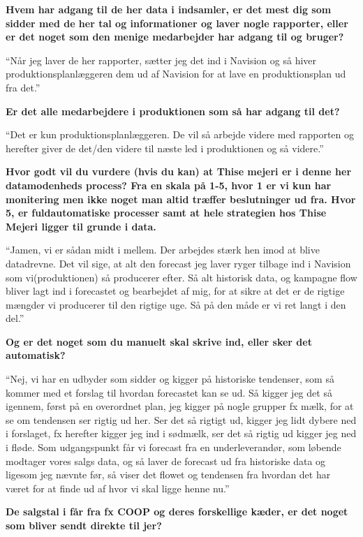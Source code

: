 \documentclass[
  12pt,
  a4paper,
  DIV=11,
  numbers=noendperiod]{scrartcl}
\begin{document}
\begin{itemize}
  \textbf{Hvem har adgang til de her data i indsamler, er det mest dig
  som sidder med de her tal og informationer og laver nogle rapporter,
  eller er det noget som den menige medarbejder har adgang til og
  bruger?}~

  ``Når jeg laver de her rapporter, sætter jeg det ind i Navision og så
  hiver produktionsplanlæggeren dem ud af Navision for at lave en
  produktionsplan ud fra det.''~

  \textbf{Er det alle medarbejdere i produktionen som så har adgang til
  det?}~

  ``Det er kun produktionsplanlæggeren. De vil så arbejde videre med
  rapporten og herefter giver de det/den videre til næste led i
  produktionen og så videre.''~

  \textbf{Hvor godt vil du vurdere (hvis du kan) at Thise mejeri er i
  denne her datamodenheds process? Fra en skala på 1-5, hvor 1 er vi kun
  har monitering men ikke noget man altid træffer beslutninger ud fra.
  Hvor 5, er fuldautomatiske processer samt at hele strategien hos Thise
  Mejeri ligger til grunde i data.}~

  ``Jamen, vi er sådan midt i mellem. Der arbejdes stærk hen imod at
  blive datadrevne. Det vil sige, at alt den forecast jeg laver ryger
  tilbage ind i Navision som vi(produktionen) så producerer efter. Så
  alt historisk data, og kampagne flow bliver lagt ind i forecastet og
  bearbejdet af mig, for at sikre at det er de rigtige mængder vi
  producerer til den rigtige uge. Så på den måde er vi ret langt i den
  del.''~

  \textbf{Og er det noget som du manuelt skal skrive ind, eller sker det
  automatisk?}~

  ``Nej, vi har en udbyder som sidder og kigger på historiske tendenser,
  som så kommer med et forslag til hvordan forecastet kan se ud. Så
  kigger jeg det så igennem, først på en overordnet plan, jeg kigger på
  nogle grupper fx mælk, for at se om tendensen ser rigtig ud her. Ser
  det så rigtigt ud, kigger jeg lidt dybere ned i forslaget, fx herefter
  kigger jeg ind i sødmælk, ser det så rigtig ud kigger jeg ned i fløde.
  Som udgangspunkt får vi forecast fra en underleverandør, som løbende
  modtager vores salgs data, og så laver de forecast ud fra historiske
  data og ligesom jeg nævnte før, så viser det flowet og tendensen fra
  hvordan det har været for at finde ud af hvor vi skal ligge henne
  nu.''~

  \textbf{De salgstal i får fra fx COOP og deres forskellige kæder, er
  det noget som bliver sendt direkte til jer?}~


\end{itemize}
\end{document}
